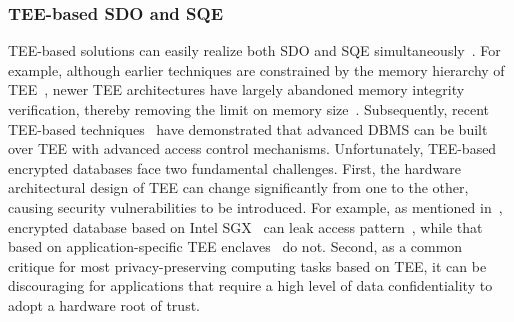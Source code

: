 \subsubsection{TEE-based SDO and SQE}
TEE-based solutions can easily realize both
SDO and SQE simultaneously~\cite{bajaj2011trusteddb, arasu2015transaction, zheng2017opaque, 
eskandarian2017oblidb, priebe2018enclavedb, mishra2018oblix, bailleu2019speicher, 
kim2019shieldstore, vinayagamurthy2019stealthdb, antonopoulos2020azure, wang2022operon}. 
For example, although earlier techniques are constrained by the memory hierarchy of 
TEE~\cite{bajaj2011trusteddb,arasu2015transaction, priebe2018enclavedb}, newer 
TEE architectures have largely abandoned memory integrity verification, thereby 
removing the limit on memory size~\cite{johnson2021supporting, feng2021scalable}. 
Subsequently, recent TEE-based techniques~\cite{antonopoulos2020azure, wang2022operon} 
have demonstrated that advanced DBMS can be built over TEE with advanced access control mechanisms.
Unfortunately, TEE-based encrypted databases face two fundamental challenges.
First, the hardware architectural design of TEE can change significantly from one to 
the other, causing security vulnerabilities to be introduced. 
For example, as mentioned in~\cite{wang2022operon}, encrypted database based on Intel 
SGX~\cite{costan2016intel} 
can leak access pattern~\cite{eskandarian2017oblidb}, while that based on application-specific
TEE enclaves~\cite{suh2007aegis} do not.
Second, as a common critique for most privacy-preserving computing tasks 
based on TEE, it can be discouraging for applications that require
a high level of data confidentiality to adopt a hardware root of trust.
